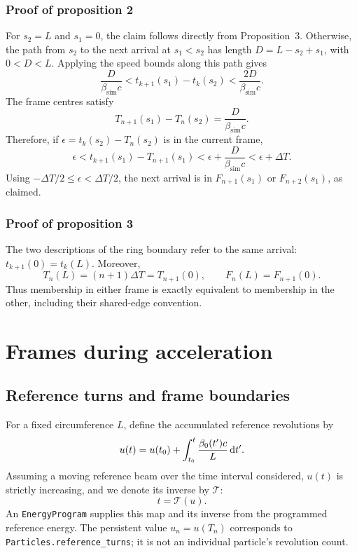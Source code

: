 \subsubsection*{Proof of proposition 2}

For $s_2=L$ and $s_1=0$, the claim follows directly from Proposition~3.
Otherwise, the path from $s_2$ to the next arrival at $s_1<s_2$ has length
$D=L-s_2+s_1$, with $0<D<L$. Applying the speed bounds along this path gives
\begin{equation}
\frac{D}{\beta_\text{sim}c}
< t_{k+1}(s_1)-t_k(s_2)
< \frac{2D}{\beta_\text{sim}c}.
\end{equation}
The frame centres satisfy
\begin{equation}
T_{n+1}(s_1)-T_n(s_2)=\frac{D}{\beta_\text{sim}c}.
\end{equation}
Therefore, if $\epsilon=t_k(s_2)-T_n(s_2)$ is in the current frame,
\begin{equation}
\epsilon < t_{k+1}(s_1)-T_{n+1}(s_1)
< \epsilon+\frac{D}{\beta_\text{sim}c}<\epsilon+\Delta T.
\end{equation}
Using $-\Delta T/2\leq\epsilon<\Delta T/2$, the next arrival is in
$F_{n+1}(s_1)$ or $F_{n+2}(s_1)$, as claimed.

\subsubsection*{Proof of proposition 3}

The two descriptions of the ring boundary refer to the same arrival:
$t_{k+1}(0)=t_k(L)$. Moreover,
\begin{equation}
T_n(L)=(n+1)\Delta T=T_{n+1}(0),
\qquad F_n(L)=F_{n+1}(0).
\end{equation}
Thus membership in either frame is exactly equivalent to membership in the
other, including their shared-edge convention.

\section{Frames during acceleration}
\label{sec:coasting_acceleration}

\subsection{Reference turns and frame boundaries}

For a fixed circumference $L$, define the accumulated reference revolutions by
\begin{equation}
u(t)=u(t_0)+\int_{t_0}^{t}\frac{\beta_0(t')c}{L}\,\text{d} t'.
\label{eq:coasting_reference_turns}
\end{equation}
Assuming a moving reference beam over the time interval considered, $u(t)$ is
strictly increasing, and we denote its inverse by $\mathcal{T}$:
\begin{equation}
t=\mathcal{T}(u).
\end{equation}
An \texttt{EnergyProgram} supplies this map and its inverse from the programmed
reference energy. The persistent value $u_n=u(T_n)$ corresponds to
\texttt{Particles.reference\_turns}; it is not an individual particle's
revolution count.


